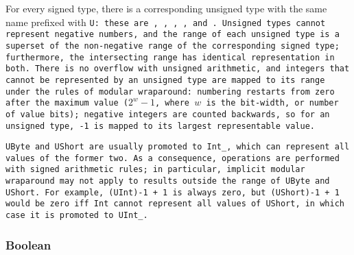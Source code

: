 \def\Subsubsection#1{\subsubsection{#1}}

For every signed type, there is a corresponding unsigned
type with the same name prefixed with \tt{U}: these are
, , , , and .
Unsigned types cannot represent negative numbers, and the range of each unsigned
type is a superset of the non-negative range of the corresponding signed type;
furthermore, the intersecting range has identical representation in both.
There is no overflow with unsigned arithmetic, and integers
that cannot be represented by an unsigned type are mapped
to its range under the rules of modular wraparound:
numbering restarts from zero after the maximum value ($2^{w} - 1$, where $w$ is
the bit-width, or number of value bits); negative integers are counted backwards,
so for an unsigned type, -1 is mapped to its largest representable value.

\note \tt{UByte} and \tt{UShort} are usually promoted to \tt{Int_},
which can represent all values of the former two.
As a consequence, operations are performed with signed arithmetic rules;
in particular, implicit modular wraparound may not apply
to results outside the range of \tt{UByte} and \tt{UShort}.
For example, \tt{(UInt)-1 + 1} is always zero, but \tt{(UShort)-1 + 1}
would be zero iff \tt{Int} cannot represent all values of \tt{UShort},
in which case it is promoted to \tt{UInt_}.

\Subsubsection{Boolean}
